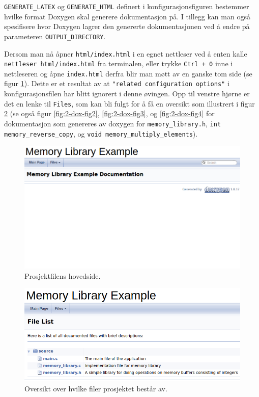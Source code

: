 \begin{alphasection}
\verb|GENERATE_LATEX| og \verb|GENERATE_HTML| definert i konfigurasjonsfiguren bestemmer hvilke format Doxygen skal generere dokumentasjon på. I tillegg kan man også spesifisere hvor Doxygen lagrer den genererte dokumentasjonen ved å endre på parameteren \verb|OUTPUT_DIRECTORY|.

Dersom man nå åpner \verb|html/index.html| i en egnet nettleser ved å enten kalle \verb|nettleser html/index.html| fra terminalen, eller trykke \verb|Ctrl + 0| inne i nettleseren og åpne \verb|index.html| derfra blir man møtt av en ganske tom side (se figur \ref{fig:2-dox-fig-main}). Dette er et resultat av at \verb|"related configuration options"| i konfigurasjonsfilen har blitt ignorert i denne øvingen. Opp til venstre hjørne er det en lenke til \verb|Files|, som kan bli fulgt for å få en oversikt som illustrert i figur \ref{fig:2-dox-fig} (se også figur \ref{fig:2-dox-fig2}, \ref{fig:2-dox-fig3}, og  \ref{fig:2-dox-fig4} for dokumentasjon som genereres av doxygen for \verb|memory_library.h|, \verb|int memory_reverse|\verb|_copy|, og \verb|void memory_multiply_elements|).


\begin{figure}[ht]
    \centering
    \includegraphics[width=135mm]{Main/figures/doxygen-main.png}
    \caption{Prosjektfilens hovedside.}
    \label{fig:2-dox-fig-main}
\end{figure}

\begin{figure}[ht]
    \centering
    \includegraphics[width=131mm]{Main/figures/doxygenfil1.png}
    \caption{Oversikt over hvilke filer prosjektet består av.}
    \label{fig:2-dox-fig}
\end{figure}



\end{alphasection}
